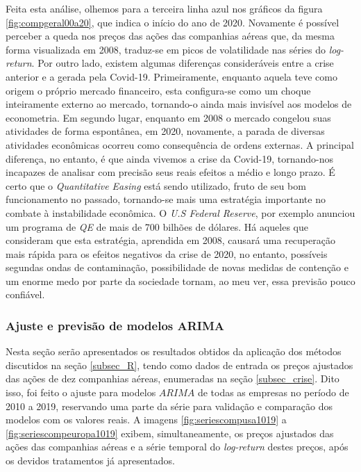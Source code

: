 \documentclass[12pt]{article}
\begin{document}
Feita esta análise, olhemos para a terceira linha azul nos gráficos da figura \ref{fig:compgeral00a20}, que indica o início do ano de 2020. Novamente é possível perceber a queda nos preços das ações das companhias aéreas que, da mesma forma visualizada em 2008, traduz-se em picos de volatilidade nas séries do \textit{log-return}. Por outro lado, existem algumas diferenças consideráveis entre a crise anterior e a gerada pela Covid-19. Primeiramente, enquanto aquela teve como origem o próprio mercado financeiro, esta configura-se como um choque inteiramente externo ao mercado, tornando-o ainda mais invisível aos modelos de econometria. Em segundo lugar, enquanto em 2008 o mercado congelou suas atividades de forma espontânea, em 2020, novamente, a parada de diversas atividades econômicas ocorreu como consequência de ordens externas. A principal diferença, no entanto, é que ainda vivemos a crise da Covid-19, tornando-nos incapazes de analisar com precisão seus reais efeitos a médio e longo prazo. É certo que o \textit{Quantitative Easing} está sendo utilizado, fruto de seu bom funcionamento no passado, tornando-se mais uma estratégia importante no combate à instabilidade econômica. O \textit{U.S Federal Reserve}, por exemplo anunciou um programa de \textit{QE} de mais de 700 bilhões de dólares. Há aqueles que consideram que esta estratégia, aprendida em 2008, causará uma recuperação mais rápida para os efeitos negativos da crise de 2020, no entanto, possíveis segundas ondas de contaminação, possibilidade de novas medidas de contenção e um enorme medo por parte da sociedade tornam, ao meu ver, essa previsão pouco confiável.
 
\subsubsection{Ajuste e previsão de modelos ARIMA}\label{subsec_for}
Nesta seção serão apresentados os resultados obtidos da aplicação dos métodos discutidos na seção \ref{subsec_R}, tendo como dados de entrada os preços ajustados das ações de dez companhias aéreas, enumeradas na seção \ref{subsec_crise}. Dito isso, foi feito o ajuste para modelos $ARIMA$ de todas as empresas no período de 2010 a 2019, reservando uma parte da série para validação e comparação dos modelos com os valores reais. A imagens \ref{fig:seriescompusa1019} a \ref{fig:seriescompeuropa1019} exibem, simultaneamente, os preços ajustados das ações das companhias aéreas e a série temporal do \textit{log-return} destes preços, após os devidos tratamentos já apresentados.
\end{document}
